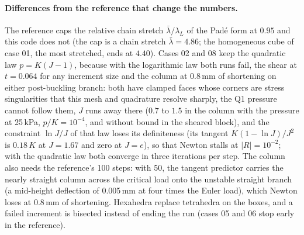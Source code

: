 \documentclass[11pt]{article}
\begin{document}
\paragraph{Differences from the reference that change the numbers.}
The reference caps the relative chain stretch
$\bar\lambda/\lambda_L$ of the Pad\'e form at $0.95$ and this code does not
(the cap is a chain stretch $\bar\lambda = 4.86$; the homogeneous cube of
case 01, the most stretched, ends at $4.40$).  Cases 02 and 08 keep the
quadratic law $p = K(J-1)$, because with the logarithmic law both runs
fail, the shear at $t = 0.064$ for any increment size and the column at
0.8\,mm of shortening on either post-buckling branch: both have clamped
faces whose corners are stress singularities that this mesh and quadrature
resolve sharply, the Q1 pressure cannot follow them, $J$ runs away there
($0.7$ to $1.5$ in the column with the pressure at 25\,kPa, $p/K = 10^{-4}$,
and without bound in the sheared block), and the constraint $\ln J/J$ of
that law loses its definiteness (its tangent $K(1 - \ln J)/J^2$ is $0.18\,K$
at $J = 1.67$ and zero at $J = e$), so that Newton stalls at
$|R| = 10^{-2}$; with the quadratic law both converge in three iterations
per step.  The column also needs the reference's 100 steps: with 50, the
tangent predictor carries the nearly straight column across the critical
load onto the unstable straight branch (a mid-height deflection of
0.005\,mm at four times the Euler load), which Newton loses at 0.8\,mm of
shortening.  Hexahedra replace tetrahedra on the boxes, and a failed
increment is bisected instead of ending the run (cases 05 and 06 stop early
in the reference).
\end{document}
